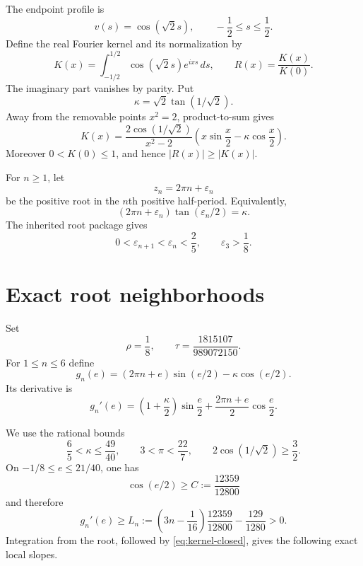 \documentclass[11pt,reqno]{amsart}
\theoremstyle{definition}
\theoremstyle{remark}
\newcommand{\eps}{\varepsilon}
\begin{document}
The endpoint profile is
\[
 v(s)=\cos(\sqrt2s),\qquad -\frac12\le s\le\frac12.
\]
Define the real Fourier kernel and its normalization by
\begin{equation}\label{eq:kernel-def}
 K(x)=\int_{-1/2}^{1/2}\cos(\sqrt2s)e^{ixs}\,ds,
 \qquad R(x)=\frac{K(x)}{K(0)}.
\end{equation}
The imaginary part vanishes by parity.  Put
\begin{equation}\label{eq:kappa}
 \kappa=\sqrt2\tan(1/\sqrt2).
\end{equation}
Away from the removable points $x^2=2$, product-to-sum gives
\begin{equation}\label{eq:kernel-closed}
 K(x)=\frac{2\cos(1/\sqrt2)}{x^2-2}
 \left(x\sin\frac x2-\kappa\cos\frac x2\right).
\end{equation}
Moreover $0<K(0)\le1$, and hence $|R(x)|\ge|K(x)|$.

For $n\ge1$, let
\begin{equation}\label{eq:roots}
 z_n=2\pi n+\eps_n
\end{equation}
be the positive root in the $n$th positive half-period.  Equivalently,
\begin{equation}\label{eq:root-equation}
 (2\pi n+\eps_n)\tan(\eps_n/2)=\kappa.
\end{equation}
The inherited root package gives
\begin{equation}\label{eq:offset-basic}
 0<\eps_{n+1}<\eps_n<\frac25,
 \qquad \eps_3>\frac18.
\end{equation}

\section{Exact root neighborhoods}

Set
\begin{equation}\label{eq:rho-tau}
 \rho=\frac18,
 \qquad \tau=\frac{1815107}{989072150}.
\end{equation}
For $1\le n\le6$ define
\[
 g_n(e)=(2\pi n+e)\sin(e/2)-\kappa\cos(e/2).
\]
Its derivative is
\begin{equation}\label{eq:gn-derivative}
 g_n'(e)=\left(1+\frac\kappa2\right)\sin\frac e2
       +\frac{2\pi n+e}{2}\cos\frac e2.
\end{equation}

We use the rational bounds
\begin{equation}\label{eq:elementary-bounds}
 \frac65<\kappa\le\frac{49}{40},\qquad
 3<\pi<\frac{22}{7},\qquad
 2\cos(1/\sqrt2)\ge\frac32.
\end{equation}
On $-1/8\le e\le21/40$, one has
\[
 \cos(e/2)\ge C:=\frac{12359}{12800}
\]
and therefore
\begin{equation}\label{eq:Ln}
 g_n'(e)\ge L_n:=
 \left(3n-\frac1{16}\right)\frac{12359}{12800}
 -\frac{129}{1280}>0.
\end{equation}
Integration from the root, followed by \eqref{eq:kernel-closed}, gives the
following exact local slopes.
\end{document}
